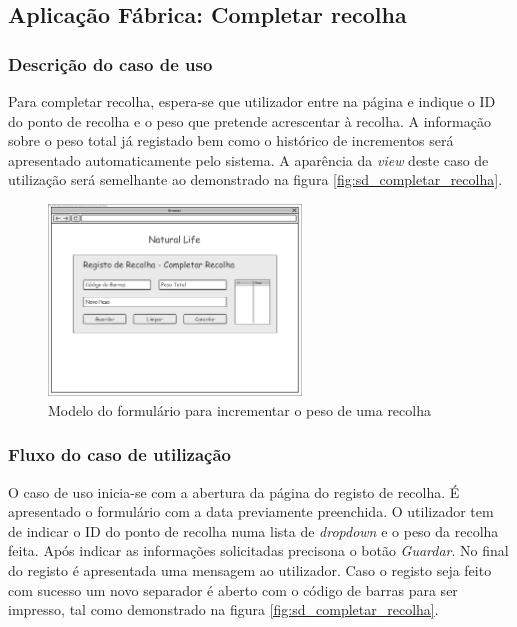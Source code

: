 \subsection{Aplicação Fábrica: Completar recolha}
\subsubsection*{Descrição do caso de uso}
Para completar recolha, espera-se que utilizador entre na página e indique o ID do ponto de recolha e o peso que pretende acrescentar à recolha. A informação sobre o peso total já registado bem como o histórico de incrementos será apresentado automaticamente pelo sistema. A aparência da \textit{view} deste caso de utilização será semelhante ao demonstrado na figura \ref{fig:sd_completar_recolha}. 

\begin{figure}[H] 
	\begin{center}
		\includegraphics[width=0.60\textwidth,keepaspectratio]{figuras/Diagramas_vp/DI_Fabrica_7_Completa_Recolha.jpg}
		\caption{Modelo do formulário para incrementar o peso de uma recolha}
		\label{fig:di_completar_recolha} 
	\end{center}
\end{figure}

\subsubsection*{Fluxo do caso de utilização}
O caso de uso inicia-se com a abertura da página do registo de recolha. É apresentado o formulário com a data previamente preenchida. O utilizador tem de indicar o ID do ponto de recolha numa lista de \textit{dropdown} e o peso da recolha feita. Após indicar as informações solicitadas precisona o botão \textit{Guardar}. No final do registo é apresentada uma mensagem ao utilizador. Caso o registo seja feito com sucesso um novo separador é aberto com o código de barras para ser impresso, tal como demonstrado na figura \ref{fig:sd_completar_recolha}.


